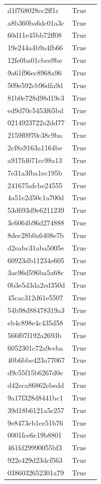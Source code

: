 \begin{tabular}{lrl}
d1f768028cc2ff1c & True &  \\
a8b360ba6dc01a3c & True &  \\
60d11e45bb72ff08 & True &  \\
19e244a4b9a4fb66 & True &  \\
12fe0ba01cbee9be & True &  \\
9a61f96ec8968a96 & True &  \\
509e592cb96dfa9d & True &  \\
81b0e728d98d19c3 & True &  \\
ed9d70c5453f65bd & True &  \\
0214923722a2dd77 & True &  \\
2159f0970c38c9ba & True &  \\
2cf8a9163a1164be & True &  \\
a917fd671cc98a13 & True &  \\
7e31a3fba1ec195b & True &  \\
241675afcbe24555 & True &  \\
4a51e2d50c1a700d & True &  \\
53d693d9e6211239 & True &  \\
3c6064b96d274888 & True &  \\
8dec28b0a6408e7b & True &  \\
d2eabc31aba5005e & True &  \\
60923db11234e605 & True &  \\
3ae96d596ba5a68c & True &  \\
0b3e5d3da2ed350d & True &  \\
45cac312d61e5507 & True &  \\
54b98d88478319a3 & True &  \\
eb4c898e4c435d58 & True &  \\
566f07f192a2693b & True &  \\
6052301c72a9ceba & True &  \\
40b6bbe423a77067 & True &  \\
d9c55f15b6267d0e & True &  \\
d42eca86862ebedd & True &  \\
9a17f328d8441bc1 & True &  \\
39d18b6121a5e257 & True &  \\
9e8473cb1ce51b76 & True &  \\
0001fce6c19b8801 & True &  \\
461fd29990055bf3 & True &  \\
922e429d23dcf563 & True &  \\
0386032652301a79 & True &  \\

\end{tabular}
